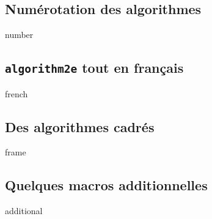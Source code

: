 \subsection{Numérotation des algorithmes}

{number}




\subsection{\texttt{algorithm2e} tout en français}

{french}




\subsection{Des algorithmes cadrés}

{frame}




\subsection{Quelques macros additionnelles} \label{algo-extra}

{additional}